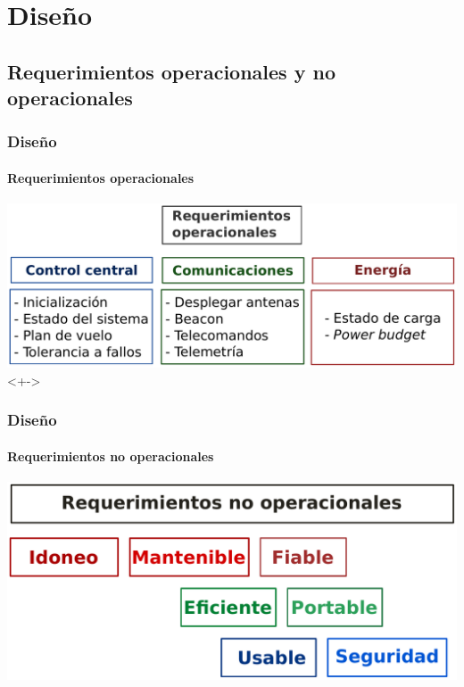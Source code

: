 \documentclass[xcolor=dvipsnames]{beamer}
\begin{document}
    \section{Diseño}
    \subsection{Requerimientos operacionales y no operacionales}
    \begin{frame}
        \frametitle{Diseño}
        \framesubtitle{Requerimientos operacionales}
        \centering
        \includegraphics[height=0.45\textheight]{img/requerimientos_op.pdf}<+->
    \end{frame}
    
    \begin{frame}
        \frametitle{Diseño}
        \framesubtitle{Requerimientos no operacionales}
        \centering
        \includegraphics[height=0.45\textheight]{img/requerimientos_noop.pdf}
    \end{frame}
\end{document}
